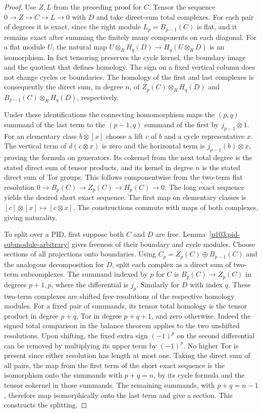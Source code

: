 \documentclass[11pt,oneside,openany]{book}
\theoremstyle{definition}
\theoremstyle{remark}
\begin{document}
\begin{proof}
Use \(Z,L\) from the preceding proof for \(C\).
Tensor the sequence \(0\to Z\to C\to L\to0\) with \(D\)
and take direct-sum total complexes. For each pair of degrees
it is exact, since the right module \(L_p=B_{p-1}(C)\)
is flat, and it remains exact after summing the finitely many
components on each diagonal. For a flat module \(U\),
the natural map \(U\otimes_R H_q(D)\to H_q(U\otimes_R D)\)
is an isomorphism. In fact tensoring preserves the cycle
kernel, the boundary image and the quotient that defines
homology. The sign on a fixed vertical column does not change
cycles or boundaries. The homology of the first and last
complexes is consequently the direct sum, in degree \(n\),
of \(Z_p(C)\otimes_R H_q(D)\) and
\(B_{p-1}(C)\otimes_R H_q(D)\), respectively.

Under these identifications the connecting homomorphism
maps the \((p,q)\) summand of the last term to the
\((p-1,q)\) summand of the first by \(j_{p-1}\otimes1\).
For an elementary class \(b\otimes[x]\) choose a lift
\(c\) of \(b\) and a cycle representative \(x\).
The vertical term of \(d(c\otimes x)\) is zero and the
horizontal term is \(j_{p-1}(b)\otimes x\), proving the
formula on generators. Its cokernel from the next total
degree is the stated direct sum of tensor products, and
its kernel in degree \(n\) is the stated direct sum of
Tor groups. This follows componentwise from the two-term
flat resolution \(0\to B_p(C)\to Z_p(C)\to H_p(C)\to0\).
The long exact sequence yields the desired short exact
sequence. The first map on elementary classes is
\([c]\otimes[x]\mapsto[c\otimes x]\). The constructions
commute with maps of both complexes, giving naturality.

To split over a PID, first suppose both \(C\) and \(D\) are
free. Lemma~\ref{p103:pid-submodule-arbitrary} gives freeness of
their boundary and cycle modules. Choose sections of all
projections onto boundaries.
Using \(C_p=Z_p(C)\oplus B_{p-1}(C)\) and the analogous
decomposition for \(D\), split each complex as a direct sum
of two-term subcomplexes. The summand indexed by \(p\)
for \(C\) is \(B_p(C)\to Z_p(C)\) in degrees \(p+1,p\),
where the differential is \(j_p\). Similarly for \(D\)
with index \(q\). These two-term complexes are shifted
free resolutions of the respective homology modules.
For a fixed pair of summands, its tensor total homology
is the tensor product in degree \(p+q\), Tor in degree
\(p+q+1\), and zero otherwise. Indeed the signed total
comparison in the balance theorem applies to the two
unshifted resolutions. Upon shifting, the fixed extra
sign \((-1)^p\) on the second differential can be
removed by multiplying its upper term by \((-1)^p\).
No higher Tor is present since either resolution has
length at most one. Taking the direct sum of all pairs,
the map from the first term of the short exact sequence
is the isomorphism onto the summands with \(p+q=n\),
by its cycle formula and the tensor cokernel in those
summands. The remaining summands, with \(p+q=n-1\),
therefore map isomorphically onto the last term and
give a section. This constructs the splitting.


\end{proof}
\end{document}
